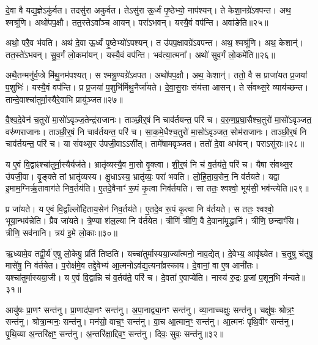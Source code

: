 दे॒वा वै यद्य॒ज्ञे\-ऽकु॑र्वत।
तदसु॑रा अकुर्वत।
तेऽसु॑रा ऊ॒र्ध्वं पृ॒ष्ठेभ्यो॒ नाप॑श्यन्।
ते केशा॒नग्रे॑\-ऽवपन्त।
अथ॒ श्मश्रू॑णि।
अथो॑प\-प॒क्षौ।
तत॒स्ते\-ऽवा᳚ञ्च आयन्।
परा॑ऽभवन्।
यस्यै॒वं वप॑न्ति।
अवा॑ङेति॥२५॥

अथो॒ परै॒व भ॑वति।
अथ॑ दे॒वा ऊ॒र्ध्वं पृ॒ष्ठेभ्यो॑\-ऽपश्यन्।
त उ॑पप॒क्षावग्रे॑\-ऽवपन्त।
अथ॒ श्मश्रू॑णि।
अथ॒ केशान्॑।
तत॒स्ते॑\-ऽभवन्।
सु॒व॒र्गं लो॒कमा॑यन्।
यस्यै॒वं वप॑न्ति।
भव॑त्या॒त्मना᳚।
अथो॑ सुव॒र्गं लो॒कमे॑ति॥२६॥

अथै॒तन्मनु॑र्व॒प्त्रे मि॑थु॒नम॑पश्यत्।
स श्मश्रू॒ण्यग्रे॑ऽवपत।
अथो॑पप॒क्षौ।
अथ॒ केशान्॑।
ततो॒ वै स प्राजा॑यत प्र॒जया॑ प॒शुभिः॑।
यस्यै॒वं वप॑न्ति।
प्र प्र॒जया॑ प॒शुभि॑र्मिथु॒नैर्जा॑यते।
दे॒वा॒सु॒राः संय॑त्ता आसन्।
ते सं॑वथ्स॒रे व्याय॑च्छन्त।
तान्दे॒वाश्चा॑तुर्मा॒स्यैरे॒वाभि प्रायु॑ञ्जत॥२७॥

वै॒श्व॒दे॒वेन॑ च॒तुरो॑ मा॒सो॑\-ऽवृञ्ज॒तेन्द्र॑राजानः।
ताञ्छी॒र्॒षं नि चा\-व॑र्तयन्त॒ परि॑ च।
व॒रु॒ण॒प्र॒घा॒सैश्च॒तुरो॑ मा॒सो॑\-ऽवृञ्जत॒ वरु॑ण\-राजानः।
ताञ्छी॒र्॒षं नि चा\-व॑र्तयन्त॒ परि॑ च।
सा॒क॒मे॒धैश्च॒तुरो॑ मा॒सो॑\-ऽवृञ्जत॒ सोम॑\-राजानः।
ताञ्छी॒र्॒षं नि चा\-व॑र्तयन्त॒ परि॑ च।
या सं॑वथ्स॒र उ॑पजी॒वा\-ऽऽसी᳚त्।
तामे॑षामवृञ्जत।
ततो॑ दे॒वा अभ॑वन्।
पराऽसु॑राः॥२८॥

य ए॒वं वि॒द्वाꣴश्चा॑तुर्मा॒स्यैर्यज॑ते।
भ्रातृ॑व्यस्यै॒व मा॒सो वृ॒क्त्वा।
शी॒र्॒षं नि च॑ व॒र्तय॑ते॒ परि॑ च।
यैषा सं॑वथ्स॒र उ॑पजी॒वा।
वृ॒ङ्क्ते तां भ्रातृ॑व्यस्य।
क्षु॒धा\-ऽस्य॒ भ्रातृ॑व्यः॒ परा॑ भवति।
लो॒हि॒ता॒य॒सेन॒ नि व॑र्तयते।
यद्वा इ॒माम॒ग्निर्\mbox{}ऋ॒तावाग॑ते निव॒र्तय॑ति।
ए॒तदे॒वैनाꣳ॑ रू॒पं कृ॒त्वा निव॑र्तयति।
सा ततः॒ श्वश्वो॒ भूय॑सी॒ भव॑न्त्येति॥२९॥

प्र जा॑यते।
य ए॒वं वि॒द्वाँल्लो॑हिताय॒सेन॑ निव॒र्तय॑ते।
ए॒तदे॒व रू॒पं कृ॒त्वा नि व॑र्तयते।
स ततः॒ श्वश्वो॒ भूया॒न्भव॑न्नेति।
प्रैव जा॑यते।
त्रे॒ण्या श॑ल॒ल्या नि व॑र्तयेत।
त्रीणि॑ त्रीणि॒ वै दे॒वाना॑मृ॒द्धानि॑।
त्रीणि॒ छन्दाꣳ॑सि।
त्रीणि॒ सव॑नानि।
त्रय॑ इ॒मे लो॒काः॥३०॥

ऋ॒ध्यामे॒व तद्वी॒र्य॑ ए॒षु लो॒केषु॒ प्रति॑ तिष्ठति।
यच्चा॑तुर्मास्य\-या॒ज्या᳚त्मनो॒ नाव॒द्येत्।
दे॒वेभ्य॒ आवृ॑श्च्येत।
च॒तृ॒षु च॑तृषु॒ मासे॑षु॒ नि व॑र्तयेत।
प॒रोक्ष॑मे॒व तद्दे॒वेभ्य॑ आ॒त्मनो\-ऽव॑द्य॒त्यना᳚\-व्रस्काय।
दे॒वानां॒ वा ए॒ष आनी॑तः।
यश्चा॑तुर्मास्यया॒जी।
य ए॒वं वि॒द्वान्नि च॑ व॒र्तय॑ते॒ परि॑ च।
दे॒वता॑ ए॒वाप्ये॑ति।
नास्य॑ रु॒द्रः प्र॒जां प॒शून॒भि म॑न्यते॥३१॥\anuvakamend[ए॒त्ये॒त्य॒यु॒ञ्ज॒तासु॑रा एति लो॒का म॑न्यते]

आयु॑षः प्रा॒णꣳ सन्त॑नु।
प्रा॒णाद॑पा॒नꣳ सन्त॑नु।
अ॒पा॒नाद्व्या॒नꣳ सन्त॑नु।
व्या॒नाच्चक्षुः॒ सन्त॑नु।
चक्षु॑षः॒ श्रोत्र॒ꣳ॒ सन्त॑नु।
श्रोत्रा॒न्मनः॒ सन्त॑नु।
मन॑सो॒ वाच॒ꣳ॒ सन्त॑नु।
वा॒च आ॒त्मान॒ꣳ॒ सन्त॑नु।
आ॒त्मनः॑ पृथि॒वीꣳ सन्त॑नु।
पृ॒थि॒व्या अ॒न्तरि॑क्ष॒ꣳ॒ सन्त॑नु।
अ॒न्तरि॑क्षा॒द्दिव॒ꣳ॒ सन्त॑नु।
दिवः॒ सुवः॒ सन्त॑नु॥३२॥\anuvakamend[अ॒न्तरि॑क्ष॒ꣳ॒ सन्त॑नु॒ द्वे च॑]

